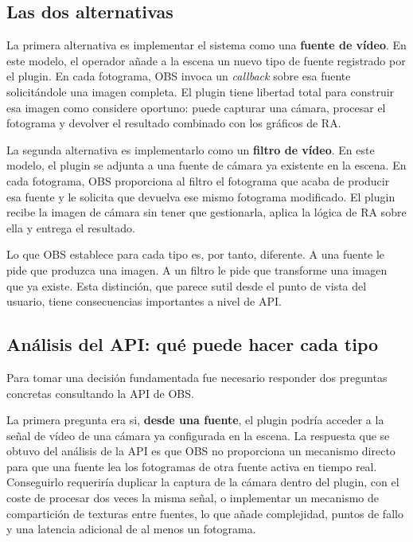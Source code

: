 \subsection{Las dos alternativas }
\label{subsec:alternativas_obs}

La primera alternativa es implementar el sistema como una \textbf{fuente de vídeo}. En este modelo, el operador añade a la escena un nuevo tipo de fuente registrado por el plugin. En cada fotograma, OBS invoca un \textit{callback} sobre esa fuente solicitándole una imagen completa. El plugin tiene libertad total para construir esa imagen como considere oportuno: puede capturar una cámara, procesar el fotograma y devolver el resultado combinado con los gráficos de RA.

La segunda alternativa es implementarlo como un \textbf{filtro de vídeo}. En este modelo, el plugin se adjunta a una fuente de cámara ya existente en la escena. En cada fotograma, OBS proporciona al filtro el fotograma que acaba de producir esa fuente y le solicita que devuelva ese mismo fotograma modificado. El plugin recibe la imagen de cámara sin tener que gestionarla, aplica la lógica de RA sobre ella y entrega el resultado.

Lo que OBS establece para cada tipo es, por tanto, diferente. A una fuente le pide que produzca una imagen. A un filtro le pide que transforme una imagen que ya existe. Esta distinción, que parece sutil desde el punto de vista del usuario, tiene consecuencias importantes a nivel de API.

\subsection{Análisis del API: qué puede hacer cada tipo}
\label{subsec:analisis_api}

Para tomar una decisión fundamentada fue necesario responder dos preguntas concretas consultando la API de OBS.

La primera pregunta era si, \textbf{desde una fuente}, el plugin podría acceder a la señal de vídeo de una cámara ya configurada en la escena. La respuesta que se obtuvo del análisis de la API es que OBS no proporciona un mecanismo directo para que una fuente lea los fotogramas de otra fuente activa en tiempo real. Conseguirlo requeriría duplicar la captura de la cámara dentro del plugin, con el coste de procesar dos veces la misma señal, o implementar un mecanismo de compartición de texturas entre fuentes, lo que añade complejidad, puntos de fallo y una latencia adicional de al menos un fotograma.

